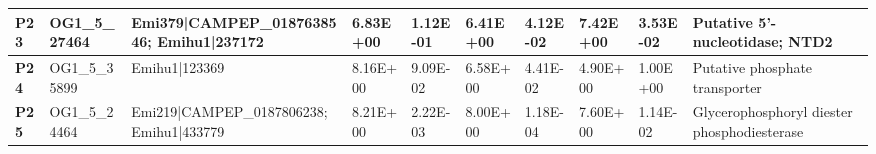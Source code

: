 \begin{landscape}
\begin{center}
\begin{footnotesize}
\begin{longtable}{|p{0.5cm}|p{1.5cm}|p{4cm}|l|l|l|l|l|l|l|}
\textbf{P23} & OG1\_5\_27464 & Emi379|CAMPEP\_0187638546; Emihu1|237172                                                                                                                                                                                                                                                                                                                                                                                                                                                                                                                                                                                                 & 6.83E+00  & 1.12E-01 & 6.41E+00  & 4.12E-02 & 7.42E+00  & 3.53E-02 & Putative 5'-nucleotidase; NTD2                                               \\ \hline
\textbf{P24} & OG1\_5\_35899 & Emihu1|123369                                                                                                                                                                                                                                                                                                                                                                                                                                                                                                                                                                                                                            & 8.16E+00  & 9.09E-02 & 6.58E+00  & 4.41E-02 & 4.90E+00  & 1.00E+00 & Putative phosphate transporter                                               \\ \hline
\textbf{P25} & OG1\_5\_24464 & Emi219|CAMPEP\_0187806238; Emihu1|433779                                                                                                                                                                                                                                                                                                                                                                                                                                                                                                                                                                                                 & 8.21E+00  & 2.22E-03 & 8.00E+00  & 1.18E-04 & 7.60E+00  & 1.14E-02 & Glycerophosphoryl diester phosphodiesterase                                  \\ \hline

\end{longtable}
\end{footnotesize}
\end{center}
\end{landscape}
